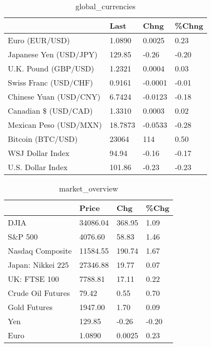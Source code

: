 \documentclass{article}%
\begin{document}
%


\begin{table}[htbp]%
\caption{global\_currencies}%
\centering%
\begin{adjustbox}{width=1\textwidth}%
\begin{tabular}{llll}
\toprule
                       &    Last &    Chng & \%Chng \\
\midrule
        Euro (EUR/USD) &  1.0890 &  0.0025 &  0.23 \\
Japanese Yen (USD/JPY) &  129.85 &   -0.26 & -0.20 \\
  U.K. Pound (GBP/USD) &  1.2321 &  0.0004 &  0.03 \\
 Swiss Franc (USD/CHF) &  0.9161 & -0.0001 & -0.01 \\
Chinese Yuan (USD/CNY) &  6.7424 & -0.0123 & -0.18 \\
  Canadian \$ (USD/CAD) &  1.3310 &  0.0003 &  0.02 \\
Mexican Peso (USD/MXN) & 18.7873 & -0.0533 & -0.28 \\
     Bitcoin (BTC/USD) &   23064 &     114 &  0.50 \\
      WSJ Dollar Index &   94.94 &   -0.16 & -0.17 \\
     U.S. Dollar Index &  101.86 &   -0.23 & -0.23 \\
\bottomrule
\end{tabular}
%
\end{adjustbox}%
\end{table}

%


\begin{table}[htbp]%
\caption{market\_overview}%
\centering%
\begin{adjustbox}{width=1\textwidth}%
\begin{tabular}{llll}
\toprule
                  &    Price &    Chg &  \%Chg \\
\midrule
             DJIA & 34086.04 & 368.95 &  1.09 \\
          S\&P 500 &  4076.60 &  58.83 &  1.46 \\
 Nasdaq Composite & 11584.55 & 190.74 &  1.67 \\
Japan: Nikkei 225 & 27346.88 &  19.77 &  0.07 \\
     UK: FTSE 100 &  7788.81 &  17.11 &  0.22 \\
Crude Oil Futures &    79.42 &   0.55 &  0.70 \\
     Gold Futures &  1947.00 &   1.70 &  0.09 \\
              Yen &   129.85 &  -0.26 & -0.20 \\
             Euro &   1.0890 & 0.0025 &  0.23 \\
\bottomrule
\end{tabular}
%
\end{adjustbox}%
\end{table}

%
\end{document}
